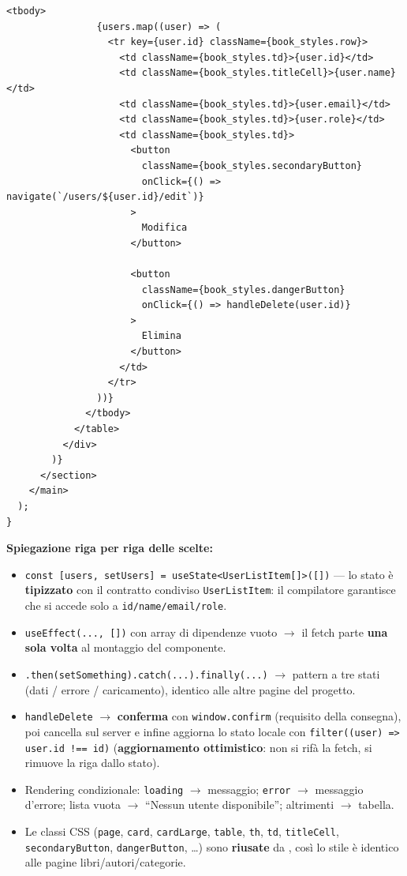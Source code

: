 \documentclass[11pt,a4paper]{article}
\newcommand{\file}[1]{\texttt{\small\seqsplit{#1}}}
\newcommand{\code}[1]{\texttt{\small #1}}
\begin{document}
\begin{lstlisting}[language=TypeScriptX]
              <tbody>
                {users.map((user) => (
                  <tr key={user.id} className={book_styles.row}>
                    <td className={book_styles.td}>{user.id}</td>
                    <td className={book_styles.titleCell}>{user.name}</td>
                    <td className={book_styles.td}>{user.email}</td>
                    <td className={book_styles.td}>{user.role}</td>
                    <td className={book_styles.td}>
                      <button
                        className={book_styles.secondaryButton}
                        onClick={() => navigate(`/users/${user.id}/edit`)}
                      >
                        Modifica
                      </button>

                      <button
                        className={book_styles.dangerButton}
                        onClick={() => handleDelete(user.id)}
                      >
                        Elimina
                      </button>
                    </td>
                  </tr>
                ))}
              </tbody>
            </table>
          </div>
        )}
      </section>
    </main>
  );
}
\end{lstlisting}

\textbf{Spiegazione riga per riga delle scelte:}

\begin{itemize}[leftmargin=1.4em]
  \item \code{const [users, setUsers] = useState<UserListItem[]>([])} --- lo stato è
        \textbf{tipizzato} con il contratto condiviso \code{UserListItem}: il
        compilatore garantisce che si accede solo a \code{id/name/email/role}.
  \item \code{useEffect(..., [])} con array di dipendenze vuoto $\rightarrow$ il
        fetch parte \textbf{una sola volta} al montaggio del componente.
  \item \code{.then(setSomething).catch(...).finally(...)} $\rightarrow$ pattern a
        tre stati (dati / errore / caricamento), identico alle altre pagine del
        progetto.
  \item \code{handleDelete} $\rightarrow$ \textbf{conferma} con \code{window.confirm}
        (requisito della consegna), poi cancella sul server e infine aggiorna lo
        stato locale con \code{filter((user) => user.id !== id)}
        (\textbf{aggiornamento ottimistico}: non si rifà la fetch, si rimuove la
        riga dallo stato).
  \item Rendering condizionale: \code{loading} $\rightarrow$ messaggio; \code{error}
        $\rightarrow$ messaggio d'errore; lista vuota $\rightarrow$ ``Nessun utente
        disponibile''; altrimenti $\rightarrow$ tabella.
  \item Le classi CSS (\code{page}, \code{card}, \code{cardLarge}, \code{table},
        \code{th}, \code{td}, \code{titleCell}, \code{secondaryButton},
        \code{dangerButton}, \ldots) sono \textbf{riusate} da
        \file{books.module.css}, così lo stile è identico alle pagine
        libri/autori/categorie.
\end{itemize}
\end{document}
